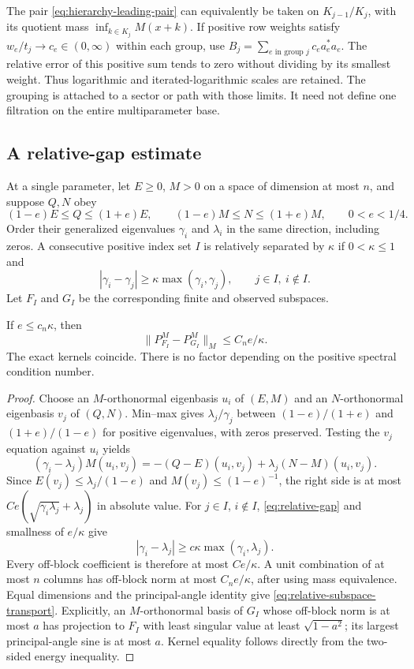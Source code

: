The pair \eqref{eq:hierarchy-leading-pair}
can equivalently be taken on
$K_{j-1}/K_j$, with its quotient mass
$\inf_{k\in K_j}M(x+k)$.
If positive row weights satisfy
$w_e/t_j\to c_e\in(0,\infty)$ within
each group, use
$B_j=\sum_{e\text{ in group }j}c_ea_e^*a_e$.
The relative error of this positive sum
tends to zero without dividing by its
smallest weight. Thus logarithmic and
iterated-logarithmic scales are retained.
The grouping is attached to a sector
or path with those limits. It need not
define one filtration on the entire
multiparameter base.

\subsection{A relative-gap estimate}

At a single parameter, let $E\ge0$, $M>0$
on a space of dimension at most $n$, and
suppose $Q,N$ obey
\[
 (1-e)E\le Q\le(1+e)E,\qquad
 (1-e)M\le N\le(1+e)M,\qquad 0<e<1/4.
\]
Order their generalized eigenvalues
$\gamma_i$ and $\lambda_i$ in the same
direction, including zeros. A consecutive
positive index set $I$ is relatively
separated by $\kappa$ if $0<\kappa\le1$
and
\begin{equation}\label{eq:relative-gap}
 |\gamma_i-\gamma_j|
       \ge\kappa\max(\gamma_i,\gamma_j),
       \qquad j\in I,\ i\notin I.
\end{equation}
Let $F_I$ and $G_I$ be the corresponding
finite and observed subspaces.

\begin{lemma}\label{lem:relative-subspace-transport}
If $e\le c_n\kappa$, then
\begin{equation}\label{eq:relative-subspace-transport}
 \|P^M_{F_I}-P^M_{G_I}\|_M\le C_ne/\kappa.
\end{equation}
The exact kernels coincide. There is no
factor depending on the positive spectral
condition number.
\end{lemma}
\begin{proof}
Choose an $M$-orthonormal eigenbasis $u_i$
of $(E,M)$ and an $N$-orthonormal eigenbasis
$v_j$ of $(Q,N)$. Min--max gives
$\lambda_j/\gamma_j$ between
$(1-e)/(1+e)$ and $(1+e)/(1-e)$
for positive eigenvalues, with zeros
preserved. Testing the $v_j$ equation
against $u_i$ yields
\[
 (\gamma_i-\lambda_j)M(u_i,v_j)
   =-(Q-E)(u_i,v_j)+\lambda_j(N-M)(u_i,v_j).
\]
Since $E(v_j)\le\lambda_j/(1-e)$ and
$M(v_j)\le(1-e)^{-1}$, the right side
is at most
$Ce(\sqrt{\gamma_i\lambda_j}+\lambda_j)$
in absolute value. For $j\in I$, $i\notin I$,
\eqref{eq:relative-gap} and smallness of
$e/\kappa$ give
\[
 |\gamma_i-\lambda_j|
       \ge c\kappa\max(\gamma_i,\lambda_j).
\]
Every off-block coefficient is therefore
at most $Ce/\kappa$. A unit combination
of at most $n$ columns has off-block
norm at most $C_ne/\kappa$, after using
mass equivalence. Equal dimensions and
the principal-angle identity give
\eqref{eq:relative-subspace-transport}.
Explicitly, an $M$-orthonormal basis of
$G_I$ whose off-block norm is at most
$a$ has projection to $F_I$ with least
singular value at least $\sqrt{1-a^2}$;
its largest principal-angle sine is at
most $a$. Kernel equality follows
directly from the two-sided energy
inequality.
\end{proof}

